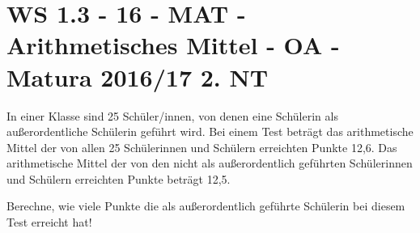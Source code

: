 \section{WS 1.3 - 16 - MAT - Arithmetisches Mittel - OA - Matura 2016/17 2. NT}

\begin{beispiel}[WS 1.3]{1} %
In einer Klasse sind 25 Schüler/innen, von denen eine Schülerin als außerordentliche Schülerin geführt wird. Bei einem Test beträgt das arithmetische Mittel der von allen 25 Schülerinnen und Schülern erreichten Punkte 12,6. Das arithmetische Mittel der von den nicht als außerordentlich geführten Schülerinnen und Schülern erreichten Punkte beträgt 12,5.\leer

Berechne, wie viele Punkte die als außerordentlich geführte Schülerin bei diesem Test erreicht hat!


\end{beispiel}